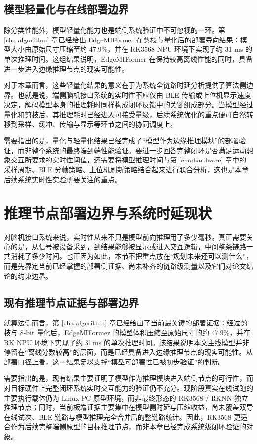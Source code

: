 \subsection{模型轻量化与在线部署边界}

除分类性能外，模型轻量化能力也是端侧系统验证中不可忽视的一环。第 \ref{cha:algorithm} 章已经给出 EdgeMIFormer 在剪枝与量化后的部署导向结果：模型大小由原始尺寸压缩至约 47.9\%，并在 RK3568 NPU 环境下实现了约 31 ms 的单次推理时间。这组结果说明，EdgeMIFormer 在保持较高离线性能的同时，具备进一步进入边缘推理节点的现实可能性。

对于本章而言，这些轻量化结果的意义在于为系统全链路时延分析提供了算法侧边界。也就是说，端侧脑机接口系统的实时性不应仅由 BLE 传输或上位机显示速度决定，解码模型本身的推理耗时同样构成闭环反馈中的关键组成部分。当模型经过量化和剪枝后，其推理耗时已经进入可接受量级，后续系统优化的重点便可自然转移到采样、缓冲、传输与显示等环节之间的协同调度上。

需要指出的是，量化与轻量化结果已经完成了“模型作为边缘推理模块”的部署验证，而非整个系统的最终端到端性能验证。要进一步回答完整闭环是否满足运动想象交互所要求的实时性阈值，还需要将模型推理时间与第 \ref{cha:hardware} 章中的采样周期、BLE 分帧策略、上位机刷新策略结合起来进行联合分析，这也是本章后续系统实时性实验所要关注的重点。

\section{推理节点部署边界与系统时延现状}

对脑机接口系统来说，实时性从来不只是模型前向推理用了多少毫秒。真正需要关心的是，从信号被设备采到，到结果能够被显示或进入交互逻辑，中间整条链路一共消耗了多少时间。也正因为如此，本节不把重点放在“规划未来还可以测什么”，而是先界定当前已经掌握的部署侧证据、尚未补齐的链路级测量以及它们对论文结论的约束边界。

\subsection{现有推理节点证据与部署边界}

就算法侧而言，第 \ref{cha:algorithm} 章已经给出了当前最关键的部署证据：经过剪枝与 8-bit 量化后，EdgeMIFormer 的模型体积压缩至原始尺寸的约 47.9\%，并在 RK NPU 环境下实现了约 31\,ms 的单次推理时间。该结果说明本文主线模型并非停留在“离线分数较高”的层面，而是已经具备进入边缘推理节点的现实可能性。从部署口径上看，这一结果足以支撑“模型可部署性已被初步验证”的判断。

需要指出的是，现有结果主要证明了模型作为推理模块进入端侧节点的可行性，而对目标硬件上完整闭环系统实时交互能力的验证仍不充分。现阶段真实在线试跑的主要执行载体仍为 Linux PC 原型环境，而非最终形态的 RK3568 / RKNN 独立推理节点；同时，当前板端证据主要集中在模型侧时延与压缩收益，尚未覆盖双导在线试次、BLE 链路与模型推理完全合并后的整链路统计。因此，RK3568 更适合作为后续完整端侧原型的目标推理节点，而非本章已经完成系统级闭环验证的对象。

